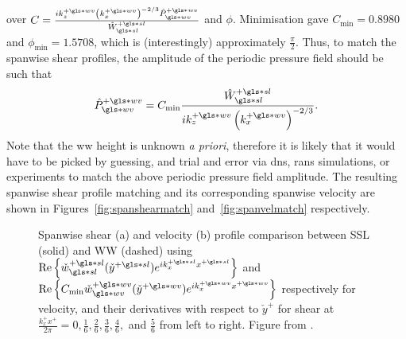 over $C=\frac{ik_z\pw \left( k_x\pw \right) ^{-2 /3}\hat{P}\pw\ww }{\hat{W}\ps\ssl}$ and $\phi $. Minimisation gave $C_\text{min} = 0.8980$ and $\phi _\text{min} =1.5708$, which is (interestingly) approximately $\frac{\pi}{2}$. Thus, to match the spanwise shear profiles, the amplitude of the periodic pressure field should be such that
\begin{equation}
	\hat{P}\pw\ww=C_\text{min} \frac{\hat{W}\ps\ssl}{ik_z\pw \left(k_x\pw\right)^{-2 /3}}\label{eq:phtselect}
.\end{equation}
Note that the \gls*{ww} height is unknown \textit{a priori}, therefore it is likely that it would have to be picked by guessing, and trial and error via \gls*{dns}, \gls*{rans} simulations, or experiments to match the above periodic pressure field amplitude. The resulting spanwise shear profile matching and its corresponding spanwise velocity are shown in Figures~\ref{fig:spanshearmatch} and~\ref{fig:spanvelmatch} respectively.

\begin{figure}[htb]
	\centering
	\caption[Spanwise shear and velocity profile comparison between SSL and WW]{Spanwise shear (a) and velocity (b) profile comparison between SSL (solid) and WW (dashed) using $\Re \left\{ \check{w}\ps\ssl (\check{y}\ps)e ^{ik_x\ps x\ps} \right\} $ and $\Re \left\{ C_\text{min} \check{w}\pw\ww (\check{y}\pw)e ^{ik_x\pw x\pw} \right\} $ respectively for velocity, and their derivatives with respect to $\check{y}^{+}$ for shear at $\frac{k_x^{+}x^{+}}{2\pi}=0, \frac{1}{6}, \frac{2}{6}, \frac{3}{6}, \frac{4}{6},$ and $\frac{5}{6}$ from left to right. Figure from \scc.}
	\label{fig:spanmatch}
\end{figure}


